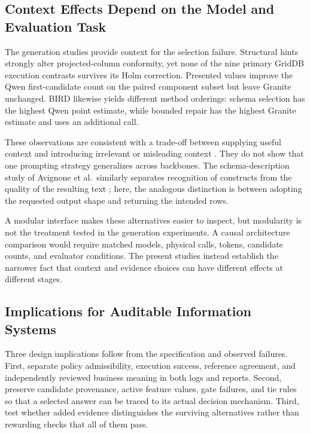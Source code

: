 \documentclass[information,article,submit,moreauthors]{Definitions/mdpi}
\begin{document}
\subsection{Context Effects Depend on the Model and Evaluation Task}

The generation studies provide context for the selection failure. Structural hints strongly alter projected-column conformity, yet none of the nine primary GridDB execution contrasts survives its Holm correction. Presented values improve the Qwen first-candidate count on the paired component subset but leave Granite unchanged. BIRD likewise yields different method orderings: schema selection has the highest Qwen point estimate, while bounded repair has the highest Granite estimate and uses an additional call.

These observations are consistent with a trade-off between supplying useful context and introducing irrelevant or misleading context \cite{bozdemir2026schema,liu2025solidsql,hao2025genlink}. They do not show that one prompting strategy generalizes across backbones. The schema-description study of Avignone et al.\ similarly separates recognition of constructs from the quality of the resulting text \cite{avignone2025exploring}; here, the analogous distinction is between adopting the requested output shape and returning the intended rows.

A modular interface makes these alternatives easier to inspect, but modularity is not the treatment tested in the generation experiments. A causal architecture comparison would require matched models, physical calls, tokens, candidate counts, and evaluator conditions. The present studies instead establish the narrower fact that context and evidence choices can have different effects at different stages.

\subsection{Implications for Auditable Information Systems}

Three design implications follow from the specification and observed failures. First, separate policy admissibility, execution success, reference agreement, and independently reviewed business meaning in both logs and reports. Second, preserve candidate provenance, active feature values, gate failures, and tie rules so that a selected answer can be traced to its actual decision mechanism. Third, test whether added evidence distinguishes the surviving alternatives rather than rewarding checks that all of them pass.
\end{document}
